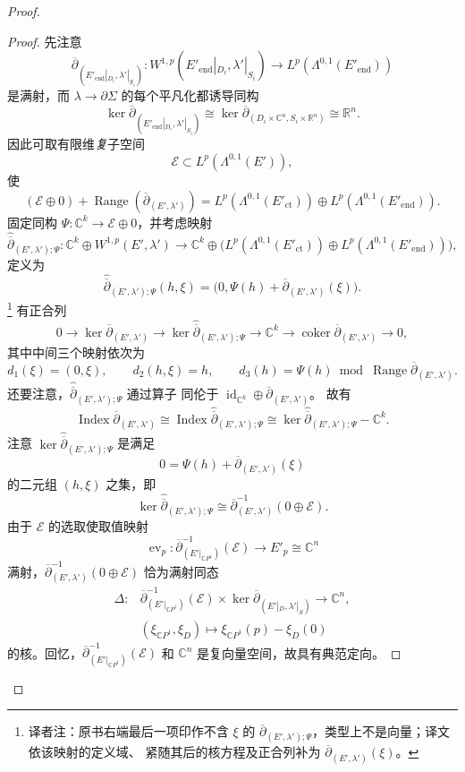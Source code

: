 \begin{proof}
\begin{proof}
先注意
\[
 \overline\partial_{(E'_{\mathrm{end}}|_{D_i},\lambda'|_{S_i})}:
 W^{1,p}(E'_{\mathrm{end}}|_{D_i},\lambda'|_{S_i})
 \longrightarrow L^p(\Lambda^{0,1}(E'_{\mathrm{end}}))
\]
是满射，而 $\lambda\to\partial\Sigma$ 的每个平凡化都诱导同构
\[
 \ker\overline\partial_{(E'_{\mathrm{end}}|_{D_i},\lambda'|_{S_i})}
 \cong\ker\overline\partial_{(D_i\times\mathbb C^n,S_i\times\mathbb R^n)}
 \cong\mathbb R^n.
\]
因此可取有限维\emph{复}子空间
\[
 \mathcal E\subset L^p(\Lambda^{0,1}(E')),
\]
使
\[
 (\mathcal E\oplus0)+\operatorname{Range}(\overline\partial_{(E',\lambda')})
 =L^p(\Lambda^{0,1}(E'_{\mathrm{ct}}))
 \oplus L^p(\Lambda^{0,1}(E'_{\mathrm{end}})).
\]
固定同构 $\Psi:\mathbb C^k\to\mathcal E\oplus0$，并考虑映射
\[
 \widehat{\overline\partial}_{(E',\lambda');\Psi}:
 \mathbb C^k\oplus W^{1,p}(E',\lambda')\longrightarrow
 \mathbb C^k\oplus
 \bigl(L^p(\Lambda^{0,1}(E'_{\mathrm{ct}}))
 \oplus L^p(\Lambda^{0,1}(E'_{\mathrm{end}}))\bigr),
\]
定义为
\[
 \widehat{\overline\partial}_{(E',\lambda');\Psi}(h,\xi)
 =\bigl(0,\Psi(h)+\overline\partial_{(E',\lambda')}(\xi)\bigr).
\]
\footnote{译者注：原书右端最后一项印作不含 $\xi$ 的
$\overline\partial_{(E',\lambda');\Psi}$，类型上不是向量；译文依该映射的定义域、
紧随其后的核方程及正合列补为
$\overline\partial_{(E',\lambda')}(\xi)$。}
有正合列
\[
 0\to\ker\overline\partial_{(E',\lambda')}
 \to\ker\widehat{\overline\partial}_{(E',\lambda');\Psi}
 \to\mathbb C^k\to\operatorname{coker}\overline\partial_{(E',\lambda')}\to0,
\]
其中中间三个映射依次为
\[
 d_1(\xi)=(0,\xi),\qquad d_2(h,\xi)=h,
 \qquad d_3(h)=\Psi(h)\bmod\operatorname{Range}\overline\partial_{(E',\lambda')}.
\]
还要注意，$\widehat{\overline\partial}_{(E',\lambda');\Psi}$ 通过\personFredholm{}算子
同伦于 $\operatorname{id}_{\mathbb C^k}\oplus\overline\partial_{(E',\lambda')}$。
故有
\begin{equation}
 \operatorname{Index}\overline\partial_{(E',\lambda')}
 \cong\operatorname{Index}\widehat{\overline\partial}_{(E',\lambda');\Psi}
 \cong\ker\widehat{\overline\partial}_{(E',\lambda');\Psi}-\mathbb C^k.
 \label{eq:stabilized-index-isomorphism}
\end{equation}
注意 $\ker\widehat{\overline\partial}_{(E',\lambda');\Psi}$ 是满足
\[
 0=\Psi(h)+\overline\partial_{(E',\lambda')}(\xi)
\]
的二元组 $(h,\xi)$ 之集，即
\[
 \ker\widehat{\overline\partial}_{(E',\lambda');\Psi}
 \cong\overline\partial_{(E',\lambda')}^{-1}(0\oplus\mathcal E).
\]
由于 $\mathcal E$ 的选取使取值映射
\[
 \operatorname{ev}_p:
 \overline\partial_{(E'|_{\mathbb CP^1})}^{-1}(\mathcal E)
 \longrightarrow E'_p\cong\mathbb C^n
\]
满射，$\overline\partial_{(E',\lambda')}^{-1}(0\oplus\mathcal E)$ 恰为满射同态
\[
\begin{aligned}
 \Delta:
 &\overline\partial_{(E'|_{\mathbb CP^1})}^{-1}(\mathcal E)
 \times\ker\overline\partial_{(E'|_D,\lambda'|_S)}\longrightarrow\mathbb C^n,\\
 &(\xi_{\mathbb CP^1},\xi_D)\longmapsto
 \xi_{\mathbb CP^1}(p)-\xi_D(0)
\end{aligned}
\]
的核。回忆，$\overline\partial_{(E'|_{\mathbb CP^1})}^{-1}(\mathcal E)$
和 $\mathbb C^n$ 是复向量空间，故具有典范定向。


\end{proof}
\end{proof}
